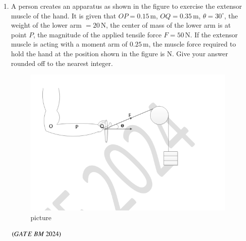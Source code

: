 \documentclass[journal,12pt,onecolumn]{IEEEtran}
\theoremstyle{remark}
\begin{document}
\begin{enumerate}
\item A person creates an apparatus as shown in the figure to exercise the extensor muscle 
of the hand. It is given that $OP = 0.15 \, \text{m}$, $OQ = 0.35 \, \text{m}$, 
$\theta = 30^\circ$, the weight of the lower arm $= 20 \, \text{N}$, the center 
of mass of the lower arm is at point $P$, the magnitude of the applied tensile force 
$F = 50 \, \text{N}$. If the extensor muscle is acting with a moment arm of 
$0.25 \, \text{m}$, the muscle force required to hold the hand at the position shown 
in the figure is \underline{\hspace{1.2cm}} N. Give your answer rounded off to the nearest integer.
\begin{figure}[H]
\centering
\includegraphics[width=0.4\columnwidth]{Figs/Fig 18.png}
\caption{picture}
\label{fig:placeholder}
\end{figure}\hfill$\brak{GATE\ BM\ 2024}$



\end{enumerate}
\end{document}
